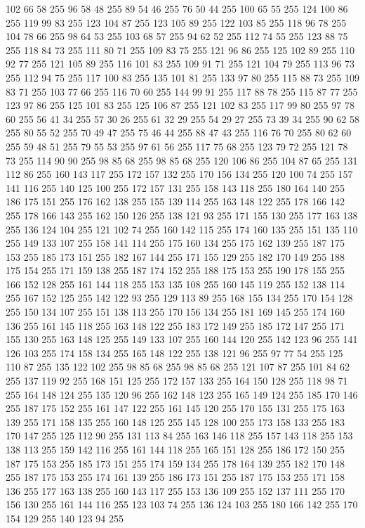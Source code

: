 102 66 58 255 96 58 48 255 89 54 46 255 76 50 44 255 100 65 55 255 124 100 86 255 119 99 83 255 123 104 87 255 123 105 89 255 122 103 85 255 118 96 78 255 104 78 66 255 98 64 53 255 103 68 57 255 94 62 52 255 112 74 55 255 123 88 75 255 118 84 73 255 111 80 71 255 109 83 75 255 121 96 86 255 125 102 89 255 110 92 77 255 121 105 89 255 116 101 83 255 109 91 71 255 121 104 79 255 113 96 73 255 112 94 75 255 117 100 83 255 135 101 81 255 133 97 80 255 115 88 73 255 109 83 71 255 103 77 66 255 116 70 60 255 144 99 91 255 117 88 78 255 115 87 77 255 123 97 86 255 125 101 83 255 125 106 87 255 121 102 83 255 117 99 80 255 97 78 60 255 56 41 34 255 57 30 26 255 61 32 29 255 54 29 27 255 73 39 34 255 90 62 58 255 80 55 52 255 70 49 47 255 75 46 44 255 88 47 43 255 116 76 70 255 80 62 60 255 59 48 51 255 79 55 53 255 97 61 56 255 117 75 68 255 123 79 72 255 121 78 73 255 114 90 90 255
98 85 68 255 98 85 68 255 120 106 86 255 104 87 65 255 131 112 86 255 160 143 117 255 172 157 132 255 170 156 134 255 120 100 74 255 157 141 116 255 140 125 100 255 172 157 131 255 158 143 118 255 180 164 140 255 186 175 151 255 176 162 138 255 155 139 114 255 163 148 122 255 178 166 142 255 178 166 143 255 162 150 126 255 138 121 93 255 171 155 130 255 177 163 138 255 136 124 104 255 121 102 74 255 160 142 115 255 174 160 135 255 151 135 110 255 149 133 107 255 158 141 114 255 175 160 134 255 175 162 139 255 187 175 153 255 185 173 151 255 182 167 144 255 171 155 129 255 182 170 149 255 188 175 154 255 171 159 138 255 187 174 152 255 188 175 153 255 190 178 155 255 166 152 128 255 161 144 118 255 153 135 108 255 160 145 119 255 152 138 114 255 167 152 125 255 142 122 93 255 129 113 89 255 168 155 134 255 170 154 128 255 150 134 107 255 151 138 113 255 170 156 134 255 181 169 145 255 174 160 136 255 161 145 118 255 163 148 122 255 183 172 149 255 185 172 147 255 171 155 130 255 163 148 125 255
149 133 107 255 160 144 120 255 142 123 96 255 141 126 103 255 174 158 134 255 165 148 122 255 138 121 96 255 97 77 54 255 125 110 87 255 135 122 102 255 98 85 68 255 98 85 68 255 121 107 87 255 101 84 62 255 137 119 92 255 168 151 125 255 172 157 133 255 164 150 128 255 118 98 71 255 164 148 124 255 135 120 96 255 162 148 123 255 165 149 124 255 185 170 146 255 187 175 152 255 161 147 122 255 161 145 120 255 170 155 131 255 175 163 139 255 171 158 135 255 160 148 125 255 145 128 100 255 173 158 133 255 183 170 147 255 125 112 90 255 131 113 84 255 163 146 118 255 157 143 118 255 153 138 113 255 159 142 116 255 161 144 118 255 165 151 128 255 186 172 150 255 187 175 153 255 185 173 151 255 174 159 134 255 178 164 139 255 182 170 148 255 187 175 153 255 174 161 139 255 186 173 151 255 187 175 153 255 171 158 136 255 177 163 138 255 160 143 117 255 153 136 109 255 152 137 111 255 170 156 130 255 161 144 116 255 123 103 74 255 136 124 103 255 180 166 142 255 170 154 129 255 140 123 94 255
